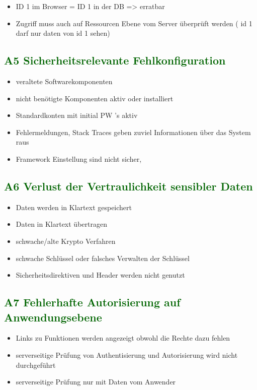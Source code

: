 	\begin{itemize}
	\item ID 1 im Browser = ID 1 in der DB => erratbar
	\item Zugriff muss auch auf Ressourcen Ebene vom Server überprüft werden ( id 1 darf nur daten von id 1 sehen)
	\end{itemize}



\subsection*{\textcolor{darkgreen}{A5 Sicherheitsrelevante Fehlkonfiguration}}

	\begin{itemize}
	\item veraltete Softwarekomponenten
	\item nicht benötigte Komponenten aktiv oder installiert
	\item Standardkonten mit initial PW\'{ '}s aktiv 
	\item Fehlermeldungen, Stack Traces geben zuviel Informationen über das System raus
	\item Framework Einstellung sind nicht sicher,
	\end{itemize}

\subsection*{\textcolor{darkgreen}{A6 Verlust der Vertraulichkeit sensibler Daten}}

	\begin{itemize}
	\item Daten werden in Klartext gespeichert
	\item Daten in Klartext übertragen
	\item schwache/alte Krypto Verfahren
	\item schwache Schlüssel oder falsches Verwalten der Schlüssel
	\item Sicherheitsdirektiven und Header werden nicht genutzt
	\end{itemize}

\subsection*{\textcolor{darkgreen}{A7 Fehlerhafte Autorisierung auf Anwendungsebene}}
\begin{itemize}
	\item Links zu Funktionen werden angezeigt obwohl die Rechte dazu fehlen
	\item serverseitige Prüfung von Authentisierung und Autorisierung wird nicht durchgeführt
	\item serverseitige Prüfung nur mit Daten vom Anwender
\end{itemize}

